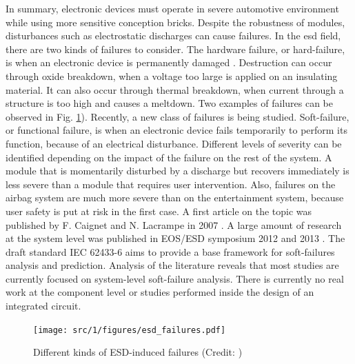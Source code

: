In summary, electronic devices must operate in severe automotive environment while using more sensitive conception bricks.
Despite the robustness of modules, disturbances such as electrostatic discharges can cause failures.
In the \gls{esd} field, there are two kinds of failures to consider.
The hardware failure, or hard-failure, is when an electronic device is permanently damaged \cite{impactESDsemiconductors}.
Destruction can occur through oxide breakdown, when a voltage too large is applied on an insulating material.
It can also occur through thermal breakdown, when current through a structure is too high and causes a meltdown.
Two examples of failures can be observed in Fig. \ref{fig:esd-failures}).
Recently, a new class of failures is being studied.
Soft-failure, or functional failure, is when an electronic device fails temporarily to perform its function, because of an electrical disturbance.
Different levels of severity can be identified depending on the impact of the failure on the rest of the system.
A module that is momentarily disturbed by a discharge but recovers immediately is less severe than a module that requires user intervention.
Also, failures on the airbag system are much more severe than on the entertainment system, because user safety is put at risk in the first case.
A first article on the topic was published by F. Caignet and N. Lacrampe in 2007 \cite{LacrampeTransientImmunity}.
A large amount of research at the system level was published in EOS/ESD symposium 2012 \cite{soft-error-esd-1,SDRAMCase,mixedModeESDSims} and 2013 \cite{softFailSubsystem, powered-tlp-soft-fail}.
The draft standard IEC 62433-6 \cite{iec62433-6} aims to provide a base framework for soft-failures analysis and prediction.
Analysis of the literature reveals that most studies are currently focused on system-level soft-failure analysis.
There is currently no real work at the component level or studies performed inside the design of an integrated circuit.

\begin{figure}[!h]
  \centering
  \texttt{[image: src/1/figures/esd\_failures.pdf]}
  \caption{Different kinds of ESD-induced failures (Credit: \cite{phd-monnereau})}
  \label{fig:esd-failures}
\end{figure}

